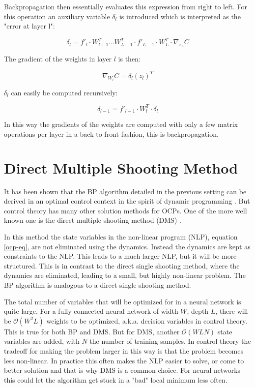Backpropagation then essentially evaluates this expression from right to left. For this operation an auxiliary variable $\delta_l$ is introduced which is interpreted as the "error at layer l":

\begin{equation}
\delta_l = f'_l \cdot W_{l+1}^T \dots W_{L-1}^T \cdot f'_{L-1} \cdot W_L^T \cdot \nabla_{z_L}C
\end{equation}

The gradient of the weights in layer $l$ is then:

\begin{equation}
\nabla_{W_l}C=\delta_l(z_l)^T
\end{equation}

$\delta_l$ can easily be computed recursively:

\begin{equation}
\delta_{l-1}  = f'_{l-1} \cdot W_l^T \cdot \delta_l
\end{equation}

In this way the gradients of the weights are computed with only a few matrix operations per layer in a back to front fashion, this is backpropagation.


\section{Direct Multiple Shooting Method}
It has been shown that the BP algorithm detailed in the previous setting can be derived in an optimal control context in the spirit of dynamic programming \cite{mizutani2000}. But control theory has many other solution methods for OCPs. One of the more well known one is the direct multiple shooting method (DMS) \cite{bock1984multiple}.

In this method the state variables in the non-linear program (NLP), equation \ref{ocp-eq}, are not eliminated using the dynamics. Instead the dynamics are kept as constraints to the NLP. This leads to a much larger NLP, but it will be more structured. This is in contrast to the direct single shooting method, where the dynamics are eliminated, leading to a small, but highly non-linear problem. The BP algorithm is analogous to a direct single shooting method.

The total number of variables that will be optimized for in a neural network is quite large. For a fully connected neural network of width $W$, depth $L$, there will be $\mathcal{O}(W^2L)$ weights to be optimized, a.k.a. decision variables in control theory. This is true for both BP and DMS. But for DMS, another $\mathcal{O}(WLN)$ state variables are added, with $N$ the number of training samples. In control theory the tradeoff for making the problem larger in this way is that the problem becomes less non-linear. In practice this often makes the NLP easier to solve, or come to better solution and that is why DMS is a common choice. For neural networks this could let the algorithm get stuck in a "bad" local minimum less often.

